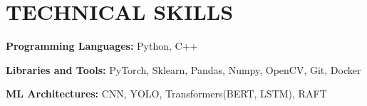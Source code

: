 \section{\color{airforceblue}TECHNICAL SKILLS}
 \begin{itemize}[leftmargin=0in, label={}]
    \small{\item{
     \textbf{\normalsize{Programming Languages:}}{ \normalsize{Python, C++}} \\
      \vspace{1.2pt}

     \textbf{\normalsize{Libraries and Tools:}}{ \normalsize{PyTorch,  Sklearn, Pandas, Numpy, OpenCV, Git, Docker}} \\
      \vspace{1.2pt}

     \textbf{\normalsize{ML Architectures:}}{ \normalsize{CNN, YOLO, Transformers(BERT, LSTM), RAFT}}

     }}
 \end{itemize}
 \vspace{-16pt}
